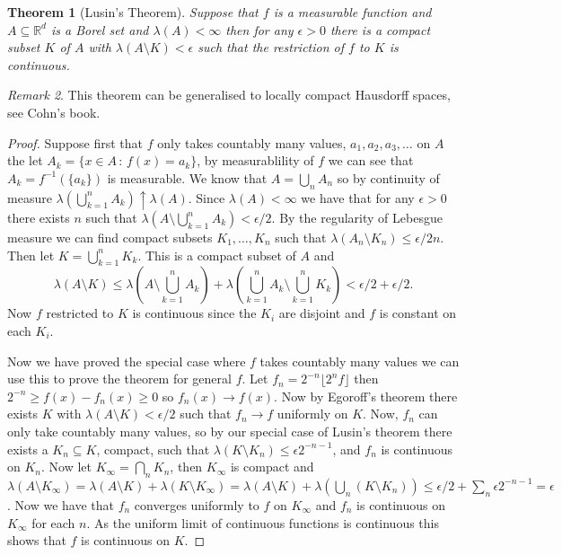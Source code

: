 \documentclass[11pt]{article}
\newtheorem{thm}{Theorem}[section]
\theoremstyle{definition}
\theoremstyle{remark}
\newtheorem{remark}[thm]{Remark}
\begin{document}
\begin{thm}[Lusin's Theorem]
Suppose that $f$ is a measurable function and $A \subseteq \mathbb{R}^d$ is a Borel set and $\lambda(A) < \infty$ then for any $\epsilon >0$ there is a compact subset $K$ of $A$ with $\lambda(A \setminus K) < \epsilon$ such that the restriction of $f$ to $K$ is continuous. 
\end{thm}
\begin{remark}
This theorem can be generalised to locally compact Hausdorff spaces, see Cohn's book.
\end{remark}
\begin{proof}
Suppose first that $f$ only takes countably many values, $a_1, a_2, a_3, \dots$ on $A$ the let $A_k = \{ x \in A \,:\, f(x) = a_k\}$, by measurablility of $f$ we can see that $A_k = f^{-1}(\{a_k\})$ is measurable. We know that $A = \bigcup_n A_n$ so by continuity of measure $\lambda(\bigcup_{k=1}^n A_k) \uparrow \lambda(A)$. Since $\lambda(A) < \infty$ we have that for any $\epsilon >0$ there exists $n$ such that $\lambda(A \setminus \bigcup_{k=1}^n A_k) < \epsilon/2$. By the regularity of Lebesgue measure we can find compact subsets $K_1, \dots, K_n$ such that $\lambda(A_n \setminus K_n) \leq \epsilon/2n$. Then let $K = \bigcup_{k=1}^n K_k$. This is a compact subset of $A$ and
\[ \lambda(A \setminus K) \leq \lambda(A\setminus \bigcup_{k=1}^n A_k) + \lambda(\bigcup_{k=1}^n A_k \setminus \bigcup_{k=1}^n K_k ) < \epsilon/2 + \epsilon/2. \]  Now $f$ restricted to $K$ is continuous since the $K_i$ are disjoint and $f$ is constant on each $K_i$.

Now we have proved the special case where $f$ takes countably many values we can use this to prove the theorem for general $f$. Let $f_n = 2^{-n} \lfloor 2^n f \rfloor$ then $2^{-n} \geq f(x)-f_n(x) \geq 0$ so $f_n(x) \rightarrow f(x)$. Now by Egoroff's theorem there exists $K$ with $\lambda(A \setminus K) < \epsilon/2$ such that $f_n \rightarrow f$ uniformly on $K$. Now, $f_n$ can only take countably many values, so by our special case of Lusin's theorem there exists a $K_n \subseteq K$, compact, such that $\lambda(K \setminus K_n) \leq \epsilon 2^{-n-1}$, and $f_n$ is continuous on $K_n$. Now let $K_\infty = \bigcap_n K_n$, then $K_\infty$ is compact and $\lambda(A \setminus K_\infty) = \lambda(A \setminus K) + \lambda(K \setminus K_\infty) = \lambda(A \setminus K) +  \lambda (\bigcup_n(K \setminus K_n)) \leq \epsilon/2 + \sum_n \epsilon 2^{-n-1} = \epsilon$. Now we have that $f_n$ converges uniformly to $f$ on $K_\infty$ and $f_n$ is continuous on $K_\infty$ for each $n$. As the uniform limit of continuous functions is continuous this shows that $f$ is continuous on $K$. 
\end{proof}
\end{document}
